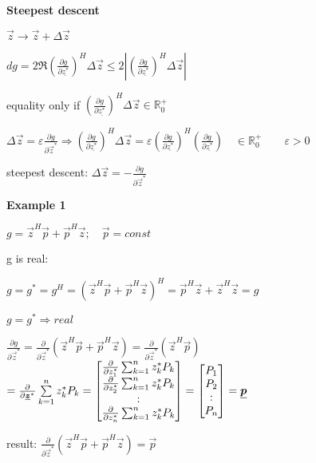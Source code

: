 \textbf{Steepest descent}

\begin{doublespace}


$\vec{z}\rightarrow\vec{z}+\Delta\vec{z}$

$dg=2\Re{\left(\frac{\partial g}{\partial \underline{z^*}}\right)^H\Delta\vec{z}} \leq2 \left|\left( \frac{\partial g}{\partial \underline{z^*}}\right)^H\Delta\vec{z} \right|$

equality only if $\left(\frac{\partial g}{\partial \underline{z^*}}\right)^H\Delta\vec{z}\in \mathbb{R}_0^+ $

$\Delta \vec{z}=\varepsilon \frac{\partial g}{\partial \vec{z}^*} \Rightarrow  \left(\frac{\partial g}{\partial \underline{z^*}}\right)^H\Delta\vec{z} = \varepsilon \left(\frac{\partial g}{\partial \underline{z^*}}\right)^H\left(\frac{\partial g}{\partial \underline{z^*}}\right)\quad \in \mathbb{R}_0^+ \qquad \varepsilon > 0$

steepest descent: $\Delta \vec{z}= -\frac{\partial g}{\partial \vec{z}^*}$
\end{doublespace}
\textbf{Example 1}

$g=\vec{z}^H\vec{p}+\vec{p}^H\vec{z}; \quad \vec{p}=const$

g is real:

$g=g^*=g^H=(\vec{z}^H\vec{p}+\vec{p}^H\vec{z})^H=\vec{p}^H\vec{z}+\vec{z}^H\vec{z}=g $

$ g=g^* \Rightarrow real$

$\frac{\partial g}{\partial \vec{z}^*}=\frac{\partial}{\partial \vec{z}^*}(\vec{z}^H\vec{p}+\vec{p}^H\vec{z})=\frac{\partial}{\partial \vec{z}^*}(\vec{z}^H\vec{p})$
$=\frac{\partial}{\partial \underline{\boldsymbol {z}}^*} \sum\limits_{k=1}^n z_k^* P_k =\begin{bmatrix}
\frac{\partial}{\partial z_1^*} \sum_{k=1}^n z_k^* P_k \\
\frac{\partial}{\partial z_2^*} \sum_{k=1}^n z_k^* P_k \\
:\\
\frac{\partial}{\partial z_n^*} \sum_{k=1}^n z_k^* P_k 
\end{bmatrix} =\begin{bmatrix}P_1\\P_2\\ :\\P_n\end{bmatrix} =\underline{\boldsymbol {p}}$

result:  $ \frac{\partial}{\partial \vec{z}^*}(\vec{z}^H\vec{p}+\vec{p}^H\vec{z}) = \vec{p} $

